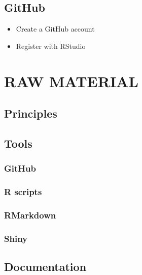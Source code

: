 \documentclass[
]{book}
\providecommand{\tightlist}{%
  \setlength{\itemsep}{0pt}\setlength{\parskip}{0pt}}
\begin{document}
\hypertarget{github}{%
\subsection{GitHub}\label{github}}

\begin{itemize}
\tightlist
\item
  Create a GitHub account
\item
  Register with RStudio
\end{itemize}

\hypertarget{raw-material}{%
\section{RAW MATERIAL}\label{raw-material}}

\hypertarget{principles}{%
\subsection{Principles}\label{principles}}

\hypertarget{tools}{%
\subsection{Tools}\label{tools}}

\hypertarget{github-1}{%
\subsubsection{GitHub}\label{github-1}}

\hypertarget{r-scripts}{%
\subsubsection{R scripts}\label{r-scripts}}

\hypertarget{rmarkdown}{%
\subsubsection{RMarkdown}\label{rmarkdown}}

\hypertarget{shiny}{%
\subsubsection{Shiny}\label{shiny}}

\hypertarget{documentation}{%
\subsection{Documentation}\label{documentation}}
\end{document}
